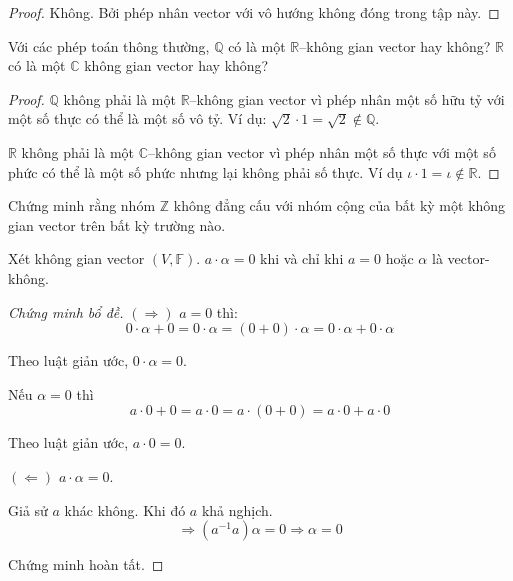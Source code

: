 \documentclass[class=linearalgebra,crop=false]{standalone}
\begin{document}
\begin{proof}Không. Bởi phép nhân vector với vô hướng không đóng trong tập này.
\end{proof}

\begin{exercise}Với các phép toán thông thường, $\mathbb{Q}$ có là một $\mathbb{R}$--không gian vector hay không? $\mathbb{R}$ có là một $\mathbb{C}$ không gian vector hay không?
\end{exercise}

\begin{proof}$\mathbb{Q}$ không phải là một $\mathbb{R}$--không gian vector vì phép nhân một số hữu tỷ với một số thực có thể là một số vô tỷ. Ví dụ: $\sqrt{2}\cdot 1 = \sqrt{2}\not\in\mathbb{Q}$.
    \par $\mathbb{R}$ không phải là một $\mathbb{C}$--không gian vector vì phép nhân một số thực với một số phức có thể là một số phức nhưng lại không phải số thực. Ví dụ $\iota\cdot 1 = \iota\not\in\mathbb{R}$.
\end{proof}

\begin{exercise}Chứng minh rằng nhóm $\mathbb{Z}$ không đẳng cấu với nhóm cộng của bất kỳ một không gian vector trên bất kỳ trường nào.
\end{exercise}

\begin{lemma}Xét không gian vector $(V, \mathbb{F})$. $a\cdot\alpha = 0$ khi và chỉ khi $a = 0$ hoặc $\alpha$ là vector-không.
\end{lemma}

\begin{proof}[Chứng minh bổ đề]$(\Rightarrow)$ $a = 0$ thì:
    \[ 0\cdot\alpha + 0 = 0\cdot\alpha = (0 + 0)\cdot\alpha = 0\cdot\alpha + 0\cdot\alpha \]
    \par Theo luật giản ước, $0\cdot\alpha = 0$.
    \par Nếu $\alpha = 0$ thì
    \[ a\cdot 0 + 0 = a\cdot 0 = a\cdot (0 + 0) = a\cdot 0 + a\cdot 0 \]
    \par Theo luật giản ước, $a\cdot 0 = 0$.
    \bigskip
    \par $(\Leftarrow)$ $a\cdot\alpha = 0$.
    \par Giả sử $a$ khác không. Khi đó $a$ khả nghịch.
    \[ \Rightarrow (a^{-1}a)\alpha = 0 \Rightarrow \alpha = 0\]
    \par Chứng minh hoàn tất.
\end{proof}
\end{document}

